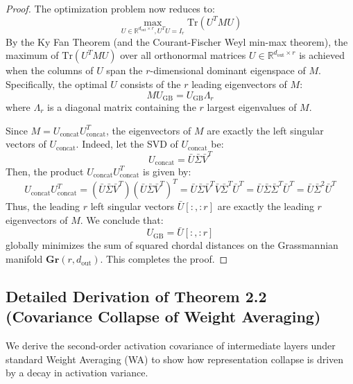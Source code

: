 \documentclass{article}
\theoremstyle{plain}
\theoremstyle{definition}
\theoremstyle{remark}
\begin{document}
\begin{proof}
The optimization problem now reduces to:
\begin{equation}
\max_{U \in \mathbb{R}^{d_{\text{out}} \times r}, U^T U = I_r} \text{Tr}(U^T M U)
\end{equation}
By the Ky Fan Theorem (and the Courant-Fischer Weyl min-max theorem), the maximum of $\text{Tr}(U^T M U)$ over all orthonormal matrices $U \in \mathbb{R}^{d_{\text{out}} \times r}$ is achieved when the columns of $U$ span the $r$-dimensional dominant eigenspace of $M$. Specifically, the optimal $U$ consists of the $r$ leading eigenvectors of $M$:
\begin{equation}
M U_{\text{GB}} = U_{\text{GB}} \Lambda_r
\end{equation}
where $\Lambda_r$ is a diagonal matrix containing the $r$ largest eigenvalues of $M$.

Since $M = U_{\text{concat}} U_{\text{concat}}^T$, the eigenvectors of $M$ are exactly the left singular vectors of $U_{\text{concat}}$. Indeed, let the SVD of $U_{\text{concat}}$ be:
\begin{equation}
U_{\text{concat}} = \bar{U} \bar{\Sigma} \bar{V}^T
\end{equation}
Then, the product $U_{\text{concat}} U_{\text{concat}}^T$ is given by:
\begin{equation}
U_{\text{concat}} U_{\text{concat}}^T = (\bar{U} \bar{\Sigma} \bar{V}^T) (\bar{U} \bar{\Sigma} \bar{V}^T)^T = \bar{U} \bar{\Sigma} \bar{V}^T \bar{V} \bar{\Sigma}^T \bar{U}^T = \bar{U} \bar{\Sigma} \bar{\Sigma}^T \bar{U}^T = \bar{U} \bar{\Sigma}^2 \bar{U}^T
\end{equation}
Thus, the leading $r$ left singular vectors $\bar{U}[:, :r]$ are exactly the leading $r$ eigenvectors of $M$. We conclude that:
\begin{equation}
U_{\text{GB}} = \bar{U}[:, :r]
\end{equation}
globally minimizes the sum of squared chordal distances on the Grassmannian manifold $\mathbf{Gr}(r, d_{\text{out}})$. This completes the proof.
\end{proof}

\subsection{Detailed Derivation of Theorem 2.2 (Covariance Collapse of Weight Averaging)}
\label{app:proof_theorem_2_2}

We derive the second-order activation covariance of intermediate layers under standard Weight Averaging (WA) to show how representation collapse is driven by a decay in activation variance.
\end{document}
